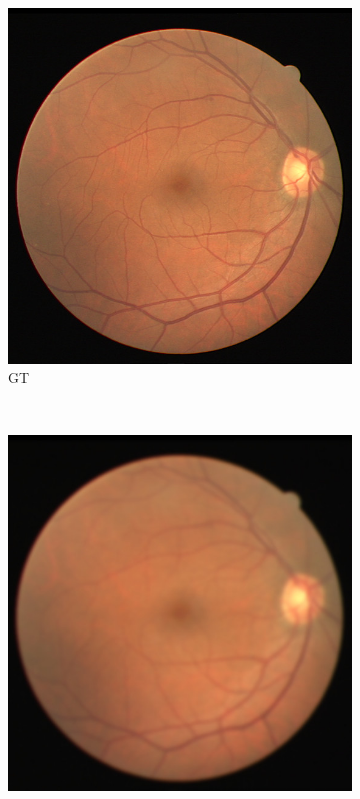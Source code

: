 \documentclass{scrartcl}
\begin{document}
\begin{figure}[htb]
\centering
\begin{subfigure}{0.33\textwidth}
\centering
    \includegraphics[width=1.0\textwidth]{deblur_gt}
    \caption{GT}
\end{subfigure}~
\begin{subfigure}{0.33\textwidth}
\centering
    \includegraphics[width=1.0\textwidth]{deblur_lr}

\end{subfigure}
\end{figure}
\end{document}
